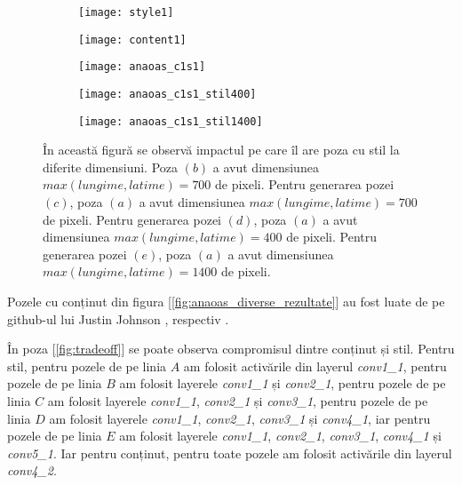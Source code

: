 \begin{figure}[h]
	\centering
    \begin{subfigure}[b]{0.19\textwidth}
		\centering
        \texttt{[image: style1]}
        \label{fig:anaoas_style1}
        \caption{}
	\end{subfigure}
    \hfill
    \begin{subfigure}[b]{0.19\textwidth}
		\centering
        \texttt{[image: content1]}
        \label{fig:anaoas_conten1}
        \caption{}
	\end{subfigure}
    \hfill
    \begin{subfigure}[b]{0.19\textwidth}
		\centering
        \texttt{[image: anaoas\_c1s1]}
        \label{fig:anaoas_c1s1}
        \caption{}
	\end{subfigure}
    \hfill
    \begin{subfigure}[b]{0.19\textwidth}
		\centering
        \texttt{[image: anaoas\_c1s1\_stil400]}
        \label{fig:anaoas_c1s1_stil400}
        \caption{}
	\end{subfigure}
    \hfill
    \begin{subfigure}[b]{0.19\textwidth}
		\centering
        \texttt{[image: anaoas\_c1s1\_stil1400]}
        \label{fig:anaoas_c1s1_stil1400}
        \caption{}
	\end{subfigure}
    \caption{În această figură se observă impactul pe care îl are poza cu stil la diferite dimensiuni. Poza $(b)$ a avut dimensiunea $max(lungime, latime) = 700$ de pixeli. Pentru generarea pozei $(c)$, poza $(a)$ a avut dimensiunea $max(lungime, latime) = 700$ de pixeli. Pentru generarea pozei $(d)$, poza $(a)$ a avut dimensiunea $max(lungime, latime) = 400$ de pixeli. Pentru generarea pozei $(e)$, poza $(a)$ a avut dimensiunea $max(lungime, latime) = 1400$ de pixeli.}
\end{figure}

Pozele cu conținut din figura [\ref{fig:anaoas_diverse_rezultate}] au fost luate de pe github-ul lui Justin Johnson \cite{continut_chicago}, respectiv \cite{continut_hoover_tower}.

În poza [\ref{fig:tradeoff}] se poate observa compromisul dintre conținut și stil. Pentru stil, pentru pozele de pe linia $A$ am folosit activările din layerul \textit{conv1{\_}1}, pentru pozele de pe linia $B$ am folosit layerele \textit{conv1{\_}1} și \textit{conv2{\_}1}, pentru pozele de pe linia $C$ am folosit layerele \textit{conv1{\_}1}, \textit{conv2{\_}1} și \textit{conv3{\_}1}, pentru pozele de pe linia $D$ am folosit layerele \textit{conv1{\_}1}, \textit{conv2{\_}1}, \textit{conv3{\_}1} și \textit{conv4{\_}1}, iar pentru pozele de pe linia $E$ am folosit layerele \textit{conv1{\_}1}, \textit{conv2{\_}1}, \textit{conv3{\_}1}, \textit{conv4{\_}1} și \textit{conv5{\_}1}. Iar pentru conținut, pentru toate pozele am folosit activările din layerul \textit{conv4{\_}2}.


